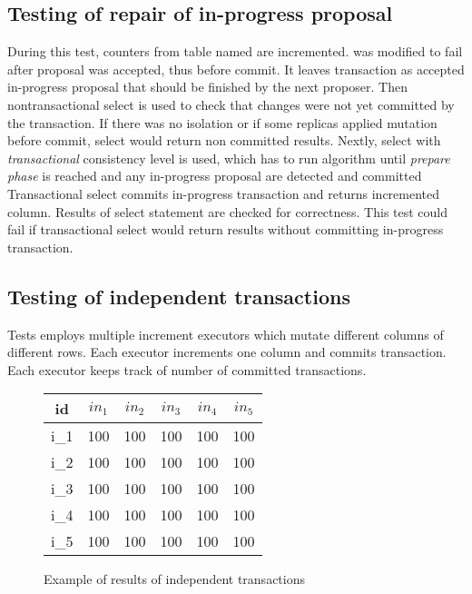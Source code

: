 \subsection{Testing of repair of in-progress proposal}
 During this test, counters from table named  are incremented. 
 \mpt was modified to fail after proposal was accepted, thus before commit. It leaves transaction as accepted in-progress proposal that should be finished by the next proposer. 
 Then nontransactional select is used to check that changes were not yet committed by the transaction. If there was no isolation or if some replicas applied mutation before commit, select would return non committed results. Nextly,
 select with \emph{transactional} consistency level is used, which has to run \mpt algorithm until \emph{prepare phase} is reached and any in-progress proposal are detected and committed
  Transactional select commits in-progress transaction and returns incremented column. Results of select statement are checked for correctness. This test could fail if transactional select would return results without committing in-progress transaction.

\subsection{Testing of independent transactions}
Tests employs multiple increment executors which mutate different columns of different rows. 
Each executor increments one column and commits transaction. Each executor keeps track of number of committed transactions. 

\begin{figure}[h]
\centering
\begin{tabular}{c||c|c|c|c|c}
        \toprule
        id & $in_{1}$ & $in_{2}$ & $in_{3}$ & $in_{4}$ & $in_{5}$ \\ \midrule
        i_1 &   100        & 100        & 100        &  100       & 100        \\
        i_2 &   100        & 100        & 100        &  100       & 100        \\
        i_3 &   100        & 100        & 100        &  100       & 100        \\
        i_4 &   100        & 100        & 100        &  100       & 100        \\        
        i_5 &   100        & 100        & 100        &  100       & 100        \\  \bottomrule
      \end{tabular}
      \caption{Example of results of independent transactions}
  \label{fig:exampleIndependentTransactions}
\end{figure}

